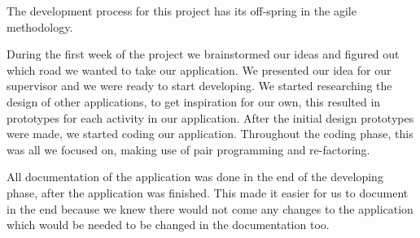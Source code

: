 The development process for this project has its off-spring in the agile methodology. 

During the first week of the project we brainstormed our ideas and figured out which road we wanted to take our application. We presented our idea for our supervisor and we were ready to start developing. We started researching the design of other applications, to get inspiration for our own, this resulted in prototypes for each activity in our application. After the initial design prototypes were made, we started coding our application. Throughout the coding phase, this was all we focused on, making use of pair programming and re-factoring. 

All documentation of the application was done in the end of the developing phase, after the application was finished. This made it easier for us to document in the end because we knew there would not come any changes to the application which would be needed to be changed in the documentation too.

